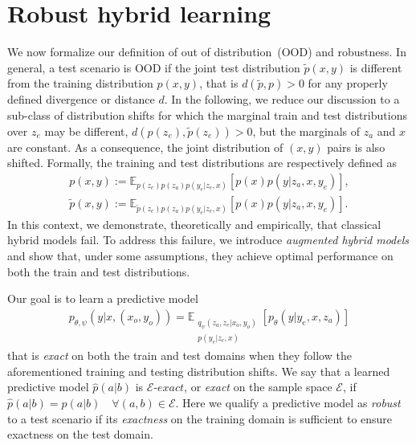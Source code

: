 \section{Robust hybrid learning}
We now formalize our definition of out of distribution~(OOD) and robustness. In general, a test scenario is OOD if the joint test distribution $\tilde{p}(x, y)$ is different from the training distribution $p(x, y)$, that is $d(\tilde{p}, p) > 0$ for any properly defined divergence or distance $d$. In the following, we reduce our discussion to a  sub-class of distribution shifts for which the marginal train and test distributions over $z_e$ may be different, $d(p(z_e),  \tilde{p}(z_e)) > 0$, but the marginals of $z_a$ and $x$ are constant. As a consequence, the joint distribution of $(x, y)$ pairs is also shifted. Formally, the training and test distributions are respectively defined as
\begin{align}
    p(x, y) := \mathbb{E}_{p(z_e) p(z_a) p(y_e|z_e, x)}\left[p(x) p(y|z_a, x, y_e) \right], \nonumber\\
    \tilde{p}(x, y) := \mathbb{E}_{\tilde{p}(z_e) p(z_a) p(y_e|z_e, x)}\left[p(x) p(y|z_a, x, y_e) \right]. \nonumber
\end{align}
In this context, we demonstrate, theoretically and empirically, that classical hybrid models fail. To address this failure, we introduce \textit{augmented hybrid models} and show that, under some assumptions, they achieve optimal performance on both the train and test distributions.

Our goal is to learn a predictive model
\begin{align}
    p_{\theta, \psi}(y|x, (x_o, y_o)) = \mathbb{E}_{\substack{q_\psi(z_a, z_e|x_o, y_o) \\ p(y_e|z_e, x)}}\left[ p_\theta(y|y_e, x, z_a)\right] \nonumber
\end{align}
that is \textit{exact} on both the train and test domains when they follow the  aforementioned training and testing distribution shifts. We say that a learned predictive model $\hat{p}(a|b)$ is $\mathcal{E}\textit{-exact}$, or \textit{exact} on the sample space $\mathcal{E}$, if $\hat{p}(a|b) = p(a|b) \quad \forall (a, b) \in \mathcal{E}$. Here we qualify a predictive model as \textit{robust} to a test scenario if its \textit{exactness} on the training domain is sufficient to ensure exactness on the test domain.

